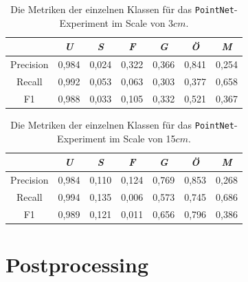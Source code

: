 \begin{table}
\centering
\begin{tabular}{c|c|c|c|c|c|c}
 & \textit{U} & \textit{S} & \textit{F} & \textit{G} & \textit{Ö} & \textit{M} \\
\hline
Precision & 0,984 & 0,024 & 0,322 & 0,366 & 0,841 & 0,254 \\
Recall    & 0,992 & 0,053 & 0,063 & 0,303 & 0,377 & 0,658 \\
F1        & 0,988 & 0,033 & 0,105 & 0,332 & 0,521 & 0,367 \\
\end{tabular}
\caption{Die Metriken der einzelnen Klassen für das \texttt{PointNet}-Experiment im Scale von 3$cm$.}
\label{table:pointnet_3_metrics}
\end{table}

\begin{table}
\centering
\begin{tabular}{c|c|c|c|c|c|c}
 & \textit{U} & \textit{S} & \textit{F} & \textit{G} & \textit{Ö} & \textit{M} \\
\hline
Precision & 0,984 & 0,110 & 0,124 & 0,769 & 0,853 & 0,268 \\
Recall    & 0,994 & 0,135 & 0,006 & 0,573 & 0,745 & 0,686 \\
F1        & 0,989 & 0,121 & 0,011 & 0,656 & 0,796 & 0,386 \\
\end{tabular}
\caption{Die Metriken der einzelnen Klassen für das \texttt{PointNet}-Experiment im Scale von 15$cm$.}
\label{table:pointnet_15_metrics}
\end{table}

\section{Postprocessing}
\label{section:postproc}

